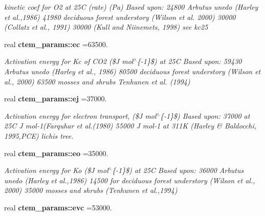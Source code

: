 \begin{DoxyCompactItemize}
\begin{DoxyCompactList}\small\item\em kinetic coef for O2 at 25\+C (rate) (Pa) Based upon\+: 24800 Arbutus unedo (Harley et al.,1986) 41980 deciduous forest understory (Wilson et al. 2000) 30000 (Collatz et al., 1991) 30000 (Kull and Niinemets, 1998) see kc25 \end{DoxyCompactList}\item 
\hypertarget{namespacectem__params_a28ee6d98bc1361ecb84e26e13942fe7d}{}real {\bfseries ctem\+\_\+params\+::ec} =63500.\label{namespacectem__params_a28ee6d98bc1361ecb84e26e13942fe7d}

\begin{DoxyCompactList}\small\item\em Activation energy for Kc of C\+O2 (\$\+J mol$^\wedge$\{-\/1\}\$) at 25\+C Based upon\+: 59430 Arbutus unedo (Harley et al., 1986) 80500 deciduous forest understory (Wilson et al., 2000) 63500 mosses and shrubs Tenhunen et al. (1994) \end{DoxyCompactList}\item 
\hypertarget{namespacectem__params_a5eb23f336fa9f9d97c402d5eb03ff3c7}{}real {\bfseries ctem\+\_\+params\+::ej} =37000.\label{namespacectem__params_a5eb23f336fa9f9d97c402d5eb03ff3c7}

\begin{DoxyCompactList}\small\item\em Activation energy for electron transport, (\$\+J mol$^\wedge$\{-\/1\}\$) Based upon\+: 37000 at 25\+C J mol-\/1(Farquhar et al.(1980) 55000 J mol-\/1 at 311\+K (Harley \& Baldocchi, 1995,P\+C\+E) lichis tree. \end{DoxyCompactList}\item 
\hypertarget{namespacectem__params_aaa562bfa9890e55635269514ceb4be0f}{}real {\bfseries ctem\+\_\+params\+::eo} =35000.\label{namespacectem__params_aaa562bfa9890e55635269514ceb4be0f}

\begin{DoxyCompactList}\small\item\em Activation energy for Ko (\$\+J mol$^\wedge$\{-\/1\}\$) at 25\+C Based upon\+: 36000 Arbutus unedo (Harley et al.,1986) 14500 for deciduous forest understory (Wilson et al., 2000) 35000 mosses and shrubs (Tenhunen et al.,1994) \end{DoxyCompactList}\item 
\hypertarget{namespacectem__params_a89f58555296ce18bb1ffa12e2360aadf}{}real {\bfseries ctem\+\_\+params\+::evc} =53000.\label{namespacectem__params_a89f58555296ce18bb1ffa12e2360aadf}


\end{DoxyCompactItemize}
